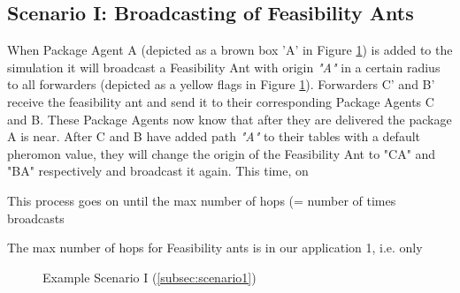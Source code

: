 \subsection*{Scenario I: Broadcasting of Feasibility Ants}
\label{subsec:scenario1}

When Package Agent A (depicted as a brown box 'A' in Figure \ref{Fig:scenario1}) is added to the simulation it will broadcast a Feasibility Ant with origin \textit{"A"} in a certain radius to all forwarders (depicted as a yellow flags in Figure \ref{Fig:scenario1}). Forwarders C' and B' receive the feasibility ant and send it to their corresponding Package Agents C and B. These Package Agents now know that after they are delivered the package A is near. After C and B have added path \textit{"A"} to their tables with a default pheromon value, they will change the origin of the Feasibility Ant to "CA" and "BA" respectively and broadcast it again. This time, on

This process goes on until the max number of hops (= number of times broadcasts

\npar The max number of hops for Feasibility ants is in our application 1, i.e. only


\begin{figure}[!h]
        \vspace{0.5pt}
        \begin{center}
       			\setlength\fboxsep{0.5pt}
				\setlength\fboxrule{0.5pt}
		\end{center}
		\caption{Example Scenario I (\ref{subsec:scenario1})}
		\label{Fig:scenario1}
        \vspace{0.5pt}
\end{figure}

